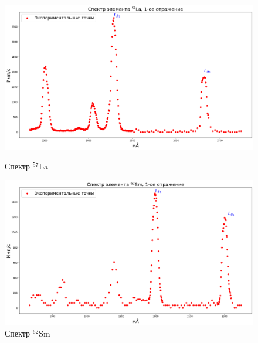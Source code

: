 \documentclass[a4paper, 12pt]{article}%
\begin{document}
		\begin{figure}[h!]
			\begin{minipage}[h]{0.49\textwidth}
				\begin{center}
					\includegraphics[width=1.02\linewidth]{Спектры/La.png}
					\caption{Спектр $^{57}$La}
				\end{center}
			\end{minipage}
			\hfill
			\begin{minipage}[h]{0.49\textwidth}
				\begin{center}
					\includegraphics[width=1.02\linewidth]{Спектры/Sm.png}
					\caption{Спектр $^{62}$Sm}
				\end{center}
			\end{minipage}
		\end{figure}
\end{document}
